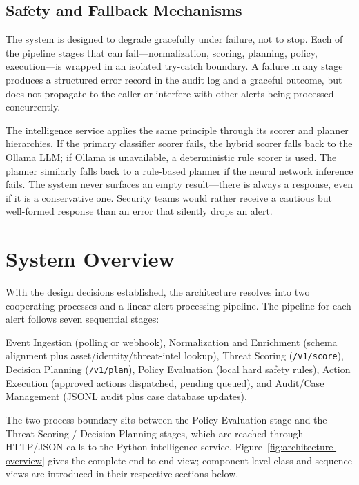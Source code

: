 \subsection{Safety and Fallback Mechanisms}

The system is designed to degrade gracefully under failure, not to stop. Each of the
pipeline stages that can fail---normalization, scoring, planning, policy, execution---is
wrapped in an isolated try-catch boundary. A failure in any stage produces a structured
error record in the audit log and a graceful outcome, but does not propagate to the
caller or interfere with other alerts being processed concurrently.

The intelligence service applies the same principle through its scorer and planner
hierarchies. If the primary classifier scorer fails, the hybrid scorer falls back to the
Ollama LLM; if Ollama is unavailable, a deterministic rule scorer is used. The planner
similarly falls back to a rule-based planner if the neural network inference fails.
The system never surfaces an empty result---there is always a response, even if it is
a conservative one. Security teams would rather receive a cautious but well-formed
response than an error that silently drops an alert.

\section{System Overview}

With the design decisions established, the architecture resolves into two cooperating
processes and a linear alert-processing pipeline. The pipeline for each alert follows
seven sequential stages:

Event Ingestion (polling or webhook), Normalization and Enrichment (schema alignment
plus asset/identity/threat-intel lookup), Threat Scoring (\texttt{/v1/score}),
Decision Planning (\texttt{/v1/plan}), Policy Evaluation (local hard safety rules),
Action Execution (approved actions dispatched, pending queued), and Audit/Case
Management (JSONL audit plus case database updates).

The two-process boundary sits between the Policy Evaluation stage and the Threat
Scoring / Decision Planning stages, which are reached through HTTP/JSON calls to the
Python intelligence service. Figure~\ref{fig:architecture-overview} gives the complete
end-to-end view; component-level class and sequence views are introduced in their
respective sections below.

